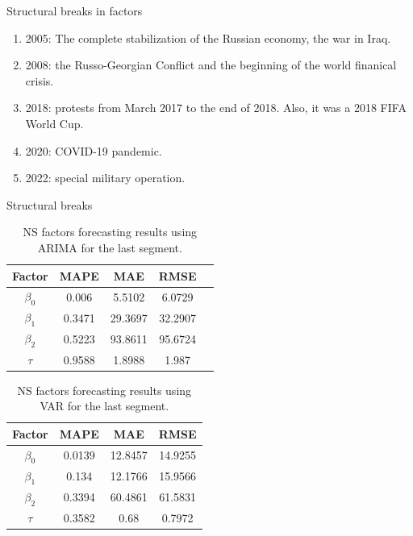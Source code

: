 \documentclass[aspectratio=169]{beamer}
\begin{document}
\begin{frame}{Structural breaks in factors}
    \begin{enumerate}
        \item 2005: The complete stabilization of the Russian economy, the war in Iraq. 
        \item 2008: the Russo-Georgian Conflict and the beginning of the world finanical crisis.
        \item 2018: protests from March 2017 to the end of 2018. Also, it was a 2018 FIFA World Cup.
        \item 2020: COVID-19 pandemic.
        \item 2022: special military operation.
    \end{enumerate}

\end{frame}


    \begin{frame}{Structural breaks}
        \begin{table}[H]
        \begin{center}
            \begin{tabular}{|c|c|c|c|c|}
                \hline
            Factor    &  MAPE         & MAE         & RMSE          \\ \hline
            $\beta_0$ &  0.006        & 5.5102      & 6.0729        \\ \hline 
            $\beta_1$ &  0.3471       & 29.3697     & 32.2907       \\ \hline 
            $\beta_2$ &  0.5223       & 93.8611     & 95.6724       \\ \hline 
            $\tau$    &  0.9588       & 1.8988      & 1.987         \\ \hline
            \end{tabular}
        \end{center}
        \caption{NS factors forecasting results using ARIMA for the last segment.}
    \end{table} 
    \begin{table}[H]
        \begin{center}
            \begin{tabular}{|c|c|c|c|}
                \hline
            Factor    &  MAPE         & MAE         & RMSE          \\ \hline
    
            $\beta_0$ &  0.0139       & 12.8457     & 14.9255       \\ \hline 
            $\beta_1$ &  0.134        &  12.1766    &  15.9566      \\ \hline 
            $\beta_2$ &  0.3394       & 60.4861     &  61.5831      \\ \hline 
            $\tau$    &  0.3582       &  0.68       &  0.7972       \\ \hline
            \end{tabular}
            \caption{NS factors forecasting results using VAR for the last segment.}
        \end{center}
    \end{table} 



    \end{frame}
\end{document}

